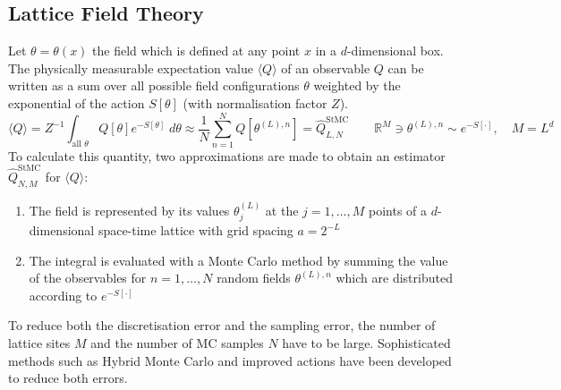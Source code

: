 \documentclass[11pt]{article}
\begin{document}
\subsection{Lattice Field Theory}
Let $\theta=\theta(x)$ the field which is defined at any point $x$ in a $d$-dimensional box. The physically measurable expectation value $\langle Q\rangle$ of an observable $Q$ can be written as a sum over all possible field configurations $\theta$ weighted by the exponential of the action $S[\theta]$ (with normalisation factor $Z$).
\begin{equation}
  \langle Q\rangle = Z^{-1} \int_{\text{all $\theta$}} Q[\theta]e^{-S[\theta]}\;d\theta \approx \frac{1}{N} \sum_{n=1}^N Q[\theta^{(L),n}] = \hat{Q}^{\text{StMC}}_{L,N} \qquad \mathbb{R}^{M}\ni \theta^{(L),n}\sim e^{-S[\cdot]},\quad M=L^d
\end{equation}
To calculate this quantity, two approximations are made to obtain an estimator $\hat{Q}^{\text{StMC}}_{N,M}$ for $\langle Q\rangle$:
\begin{enumerate}
    \item The field is represented by its values $\theta^{(L)}_j$ at the $j=1,\dots,M$ points of a $d$-dimensional space-time lattice with grid spacing $a=2^{-L}$
    \item The integral is evaluated with a Monte Carlo method by summing the value of the observables for $n=1,\dots,N$ random fields $\theta^{(L),n}$ which are distributed according to $e^{-S[\cdot ]}$
\end{enumerate}
To reduce both the discretisation error and the sampling error, the number of lattice sites $M$ and the number of MC samples $N$ have to be large. Sophisticated methods such as Hybrid Monte Carlo \cite{Duane1987} and improved actions \cite{Davies2004} have been developed to reduce both errors.
\end{document}
